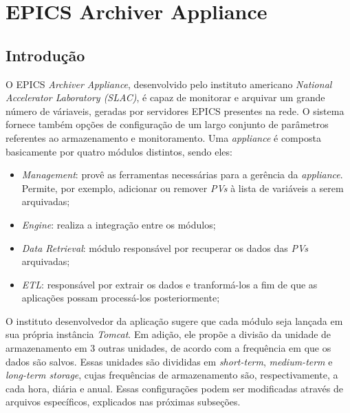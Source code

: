 \section {EPICS Archiver Appliance}
\label{sec:archiver}
\subsection {Introdução}

O EPICS \textit{Archiver Appliance}, desenvolvido pelo instituto americano
\textit{National Accelerator Laboratory (SLAC)}, é capaz de monitorar e arquivar
um grande número de váriaveis, geradas por servidores
EPICS presentes na rede. O sistema fornece também opções de configuração de um
largo conjunto de parâmetros referentes ao armazenamento e monitoramento. Uma
\textit{appliance} é composta basicamente por quatro módulos distintos, sendo eles:

\begin{itemize}
  \renewcommand\labelitemi{--}
  \item \textit{Management}: provê as ferramentas necessárias para a gerência
  da \textit{appliance}. Permite, por exemplo, adicionar ou remover \textit{PVs}
  à lista de variáveis a serem arquivadas;
  \item \textit{Engine}: realiza a integração entre os módulos;
  \item \textit{Data Retrieval}: módulo responsável por recuperar os dados das
  \textit{PVs} arquivadas;
  \item \textit{ETL}: responsável por extrair os dados e tranformá-los a fim de
  que as aplicações possam processá-los posteriormente;
\end{itemize}

% 
%     

O instituto desenvolvedor da aplicação sugere que cada módulo seja lançada em
sua própria instância \textit{Tomcat}. Em adição, ele propõe a divisão da
unidade de armazenamento em 3 outras unidades, de acordo com a frequência em que
os dados são salvos. Essas unidades são divididas em \textit{short-term},
\textit{medium-term} e \textit{long-term storage}, cujas frequências de
armazenamento são, respectivamente, a cada hora, diária e anual. Essas
configurações podem ser modificadas através de arquivos
específicos, explicados nas próximas subseções.

